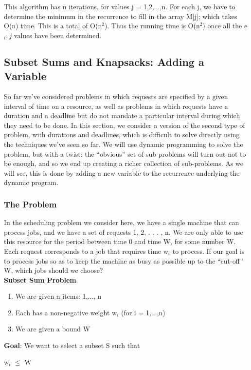 \documentclass{article}
\begin{document}
This algorithm has n iterations, for values j = 1,2,...,n. For each j, we have to determine the minimum in the recurrence to fill in the array M[j]; which takes O(n) time. This is a total of O(n$^2$). Thus the running time is O(n$^2$) once all the e$_i,j$ values have been determined.

\subsection{Subset Sums and Knapsacks: Adding a Variable}
So far we’ve considered problems in which requests are specified by a given interval of time on a resource, as well as problems in which requests have a duration and a deadline but do not mandate a particular interval during which they need to be done. In this section, we consider a version of the second type of problem, with durations and deadlines, which is difficult to solve directly using the techniques we’ve seen so far. We will use dynamic programming to solve the problem, but with a twist: the “obvious” set of sub-problems will turn out not to be enough, and so we end up creating a richer collection of sub-problems. As we will see, this is done by adding a new variable to the recurrence underlying the dynamic program.\\

\subsubsection{The Problem}
In the scheduling problem we consider here, we have a single machine that can process jobs, and we have a set of requests {1, 2, . . . , n}. We are only able to use this resource for the period between time 0 and time W, for some number W. Each request corresponds to a job that requires time w$_i$ to process. If our goal is to process jobs so as to keep the machine as busy as possible up to the “cut-off” W, which jobs should we choose?\\

\textbf{Subset Sum Problem}
\begin{enumerate}
    \item We are given n items: {1,..., n}
    \item Each has a non-negative weight w$_i$ (for i = 1,...,n)
    \item We are given a bound W
\end{enumerate}

\textbf{Goal}: We want to select a subset S such that \begin{center}
\end{center} w$_i$ $\le$ W\\
\end{document}
